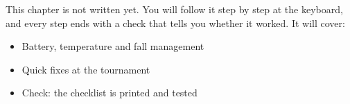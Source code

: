 \label{k:match}
\begin{keyidea}
This chapter is not written yet. You will follow it step by step at the keyboard, and every step ends with a check that tells you whether it worked. It will cover:
\begin{itemize}[nosep]
  \item Battery, temperature and fall management
  \item Quick fixes at the tournament
  \item Check: the checklist is printed and tested
\end{itemize}
\end{keyidea}

